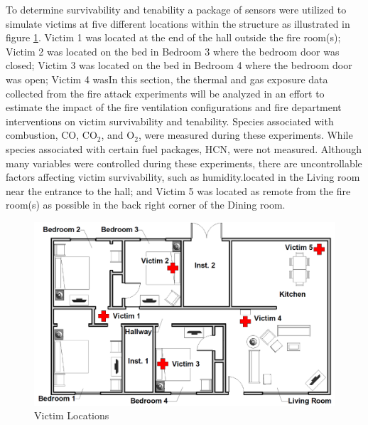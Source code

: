 \documentclass[12pt,oneside]{book}
\begin{document}


To determine survivability and tenability a package of sensors were utilized to simulate victims at five different locations within the structure as illustrated in figure \ref{fig:vic_loc}. Victim 1 was located at the end of the hall outside the fire room(s); Victim 2 was located on the bed in Bedroom 3 where the bedroom door was closed; Victim 3 was located on the bed in Bedroom 4 where the bedroom door was open; Victim 4 wasIn this section, the thermal and gas exposure data collected from the fire attack experiments will be analyzed in an effort to estimate the impact of the fire ventilation configurations and fire department interventions on victim survivability and tenability. Species associated with combustion, CO, CO$_{2}$, and O$_{2}$, were measured during these experiments. While species associated with certain fuel packages, HCN, were not measured. Although many variables were controlled during these experiments, there are uncontrollable factors affecting victim survivability, such as humidity.located in the Living room near the entrance to the hall; and Victim 5 was located as remote from the fire room(s) as possible in the back right corner of the Dining room. 

\begin{figure}[H]
	\centering
	\includegraphics[width=\textwidth]{../0_Images/Instrumentation/Victim_Locations_New.png}
	\caption{Victim Locations}
	\label{fig:vic_loc}
\end{figure}
\end{document}
